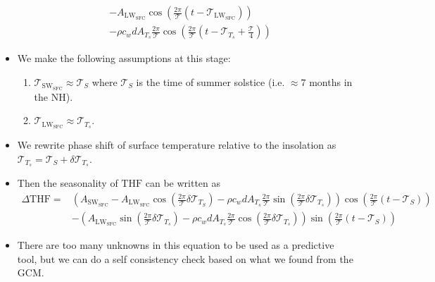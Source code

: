 \documentclass{ametsocV5}
\begin{document}
\begin{itemize}
\begin{equation}
\begin{aligned}
            &- A_{\mathrm{LW_{SFC}}}\cos\left(\frac{2\pi}{\mathcal{T}}(t-\mathscr{T}_{\mathrm{LW_{SFC}}})\right) \\
            &- \rho c_{w} d A_{T_{s}}\frac{2\pi}{\mathcal{T}}\cos\left(\frac{2\pi}{\mathcal{T}}\left(t-\mathscr{T}_{T_{s}}+\frac{\mathcal{T}}{4}\right)\right)
          \end{aligned}
        \end{equation}
  \item We make the following assumptions at this stage:
        \begin{enumerate}
          \item $\mathscr{T}_{\mathrm{SW_{SFC}}} \approx \mathscr{T}_{S}$ where $\mathscr{T}_{S}$ is the time of summer solstice (i.e. $\approx 7$ months in the NH).
          \item $\mathscr{T}_{\mathrm{LW_{SFC}}} \approx \mathscr{T}_{T_{s}}$.
        \end{enumerate}

  \item We rewrite phase shift of surface temperature relative to the insolation as $\mathscr{T}_{T_{s}}=\mathscr{T}_{S}+\delta\mathscr{T}_{T_{s}}$.
  \item Then the seasonality of $\mathrm{THF}$ can be written as
        \begin{equation} \label{eq:thf-full}
          \begin{aligned}
            \Delta \mathrm{THF} =& \left( A_{\mathrm{SW_{SFC}}} - A_{\mathrm{LW_{SFC}}}\cos\left(\frac{2\pi}{\mathcal{T}}\delta\mathscr{T}_{T_{S}}\right) - \rho c_{w} d A_{T_{s}}\frac{2\pi}{\mathcal{T}}\sin\left(\frac{2\pi}{\mathcal{T}}\delta\mathscr{T}_{T_{s}}\right) \right) \cos\left(\frac{2\pi}{\mathcal{T}}(t-\mathscr{T}_{S})\right) \\
            &- \left(A_{\mathrm{LW_{SFC}}}\sin\left(\frac{2\pi}{\mathcal{T}}\delta\mathscr{T}_{T_{s}}\right) - \rho c_{w}d A_{T_{s}}\frac{2\pi}{\mathcal{T}}\cos\left(\frac{2\pi}{\mathcal{T}}\delta\mathscr{T}_{T_{s}}\right) \right)\sin\left(\frac{2\pi}{\mathcal{T}}(t-\mathscr{T}_{S})\right)
          \end{aligned}
        \end{equation}
  \item There are too many unknowns in this equation to be used as a predictive tool, but we can do a self consistency check based on what we found from the GCM.
  \end{itemize}
\end{document}
